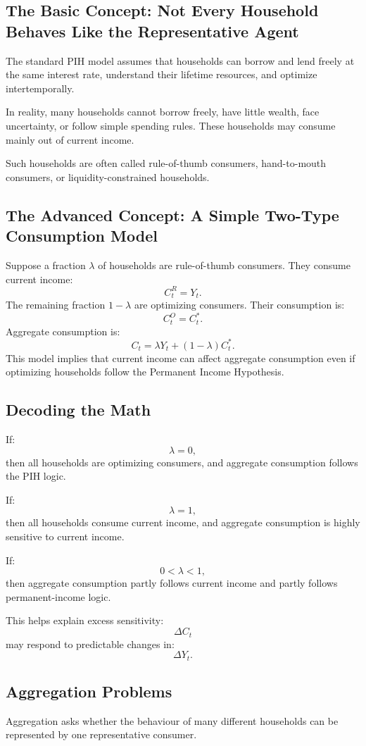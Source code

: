 \documentclass[12pt,a4paper]{article}
\begin{document}
\subsection*{The Basic Concept: Not Every Household Behaves Like the Representative Agent}
The standard PIH model assumes that households can borrow and lend freely at the same interest rate, understand their lifetime resources, and optimize intertemporally.

In reality, many households cannot borrow freely, have little wealth, face uncertainty, or follow simple spending rules. These households may consume mainly out of current income.

Such households are often called rule-of-thumb consumers, hand-to-mouth consumers, or liquidity-constrained households.

\subsection*{The Advanced Concept: A Simple Two-Type Consumption Model}
Suppose a fraction $\lambda$ of households are rule-of-thumb consumers. They consume current income:
\[ C_t^R = Y_t. \]
The remaining fraction $1 - \lambda$ are optimizing consumers. Their consumption is:
\[ C_t^O = C_t^*. \]
Aggregate consumption is:
\[ C_t = \lambda Y_t + (1 - \lambda) C_t^*. \]
This model implies that current income can affect aggregate consumption even if optimizing households follow the Permanent Income Hypothesis.

\subsection*{Decoding the Math}
If:
\[ \lambda = 0, \]
then all households are optimizing consumers, and aggregate consumption follows the PIH logic.

If:
\[ \lambda = 1, \]
then all households consume current income, and aggregate consumption is highly sensitive to current income.

If:
\[ 0 < \lambda < 1, \]
then aggregate consumption partly follows current income and partly follows permanent-income logic.

This helps explain excess sensitivity:
\[ \Delta C_t \]
may respond to predictable changes in:
\[ \Delta Y_t. \]

\subsection*{Aggregation Problems}
Aggregation asks whether the behaviour of many different households can be represented by one representative consumer.
\end{document}
